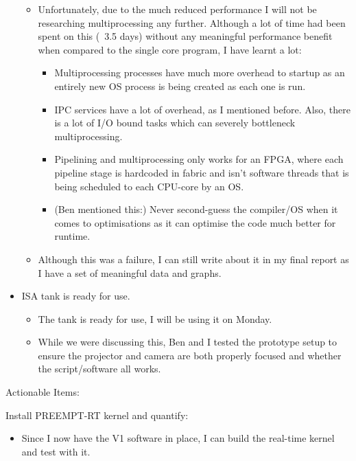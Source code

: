 \begin{itemize}
\begin{itemize}
        \item Unfortunately, due to the much reduced performance I will not be researching multiprocessing any further. Although a lot of time had been spent on this (~3.5 days) without any meaningful performance benefit when compared to the single core program, I have learnt a lot:
        \begin{itemize}
            \item Multiprocessing processes have much more overhead to startup as an entirely new OS process is being created as each one is run.
            \item IPC services have a lot of overhead, as I mentioned before. Also, there is a lot of I/O bound tasks which can severely bottleneck multiprocessing.
            \item Pipelining and multiprocessing only works for an FPGA, where each pipeline stage is hardcoded in fabric and isn't software threads that is being scheduled to each CPU-core by an OS.
            \item (Ben mentioned this:) Never second-guess the compiler/OS when it comes to optimisations as it can optimise the code much better for runtime.
        \end{itemize}
        \item Although this was a failure, I can still write about it in my final report as I have a set of meaningful data and graphs.
    \end{itemize}

    \item ISA tank is ready for use.
    \begin{itemize}
        \item The tank is ready for use, I will be using it on Monday.
        \item While we were discussing this, Ben and I tested the prototype setup to ensure the projector and camera are both properly focused and whether the script/software all works.
    \end{itemize}
\end{itemize}

Actionable Items:

\item Install PREEMPT-RT kernel and quantify:
\begin{itemize}
    \item Since I now have the V1 software in place, I can build the real-time kernel and test with it.
\end{itemize}
